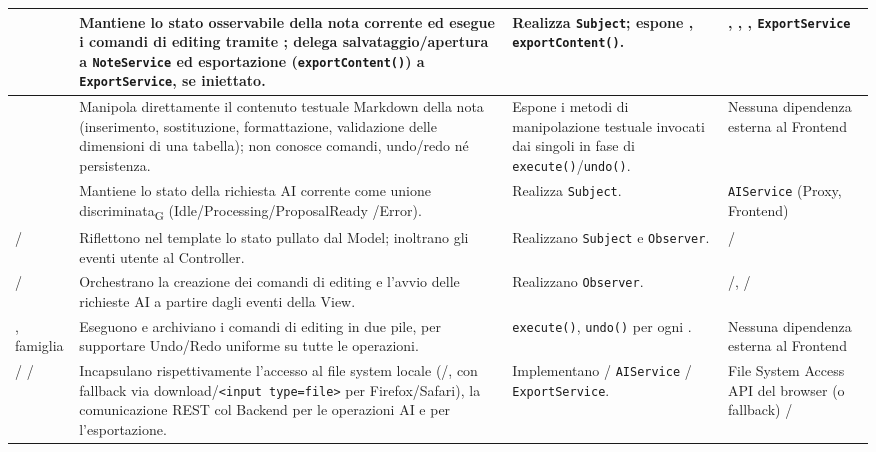\begin{xltabular}{\textwidth}{|>{\raggedright\arraybackslash\small}p{2.3cm}|p{5cm}|X|X|}
	\texttt{} & Mantiene lo stato osservabile della nota corrente ed esegue i comandi di editing tramite \texttt{}; delega salvataggio/apertura a \texttt{NoteService} ed esportazione (\texttt{exportContent()}) a \texttt{ExportService}, se iniettato. & Realizza \texttt{Subject}; espone \texttt{}, \texttt{exportContent()}. & \texttt{}, \texttt{}, \texttt{}, \texttt{ExportService} \\ \hline
	\texttt{} & Manipola direttamente il contenuto testuale Markdown della nota (inserimento, sostituzione, formattazione, validazione delle dimensioni di una tabella); non conosce comandi, undo/redo né persistenza. & Espone i metodi di manipolazione testuale invocati dai singoli \texttt{} in fase di \texttt{execute()}/\texttt{undo()}. & Nessuna dipendenza esterna al Frontend \\ \hline
	\texttt{} & Mantiene lo stato della richiesta AI corrente come unione discriminata\textsubscript{G} (Idle/Processing/ProposalReady /Error). & Realizza \texttt{Subject}. & \texttt{AIService} (Proxy, Frontend) \\ \hline
	\texttt{} / \texttt{} & Riflettono nel template lo stato pullato dal Model; inoltrano gli eventi utente al Controller. & Realizzano \texttt{Subject} e \texttt{Observer}. & \texttt{} / \texttt{} \\ \hline
	\texttt{} / \texttt{} & Orchestrano la creazione dei comandi di editing e l'avvio delle richieste AI a partire dagli eventi della View. & Realizzano \texttt{Observer}. & \texttt{}/\texttt{}, \texttt{}/\texttt{} \\ \hline
	\texttt{}, famiglia \texttt{} & Eseguono e archiviano i comandi di editing in due pile, per supportare Undo/Redo uniforme su tutte le operazioni. & \texttt{execute()}, \texttt{undo()} per ogni \texttt{}. & Nessuna dipendenza esterna al Frontend \\ \hline
	\texttt{} / \texttt{} / \texttt{} & Incapsulano rispettivamente l'accesso al file system locale (\texttt{}/\texttt{}, con fallback via download/\texttt{<input type=file>} per Firefox/Safari), la comunicazione REST col Backend per le operazioni AI e per l'esportazione. & Implementano \texttt{} / \texttt{AIService} / \texttt{ExportService}. & File System Access API del browser (o fallback) / \texttt{} \\ \hline

\end{xltabular}
